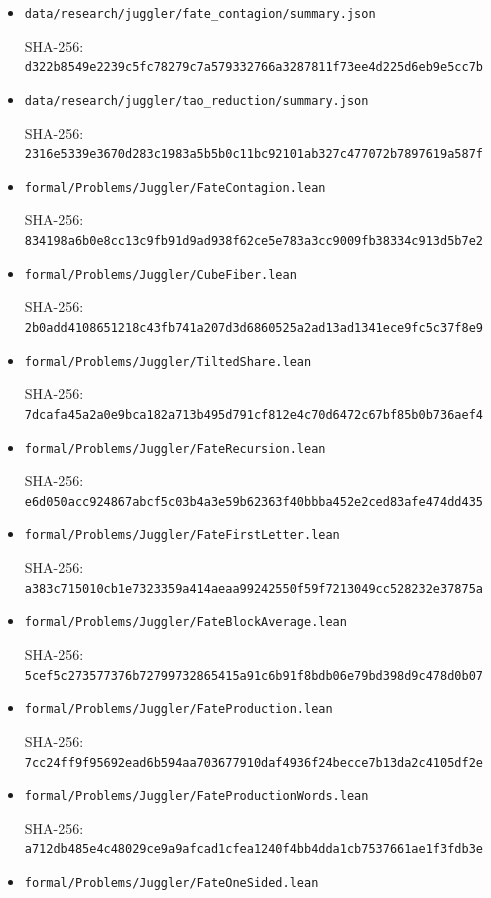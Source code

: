 \documentclass[11pt,a4paper]{article}
\begin{document}
\begin{itemize}
\item
  \texttt{\nolinkurl{data/research/juggler/fate_contagion/summary.json}}

  SHA-256:
  \texttt{\nolinkurl{d322b8549e2239c5fc78279c7a579332766a3287811f73ee4d225d6eb9e5cc7b}}
\item
  \texttt{\nolinkurl{data/research/juggler/tao_reduction/summary.json}}

  SHA-256:
  \texttt{\nolinkurl{2316e5339e3670d283c1983a5b5b0c11bc92101ab327c477072b7897619a587f}}
\item
  \texttt{\nolinkurl{formal/Problems/Juggler/FateContagion.lean}}

  SHA-256:
  \texttt{\nolinkurl{834198a6b0e8cc13c9fb91d9ad938f62ce5e783a3cc9009fb38334c913d5b7e2}}
\item
  \texttt{\nolinkurl{formal/Problems/Juggler/CubeFiber.lean}}

  SHA-256:
  \texttt{\nolinkurl{2b0add4108651218c43fb741a207d3d6860525a2ad13ad1341ece9fc5c37f8e9}}
\item
  \texttt{\nolinkurl{formal/Problems/Juggler/TiltedShare.lean}}

  SHA-256:
  \texttt{\nolinkurl{7dcafa45a2a0e9bca182a713b495d791cf812e4c70d6472c67bf85b0b736aef4}}
\item
  \texttt{\nolinkurl{formal/Problems/Juggler/FateRecursion.lean}}

  SHA-256:
  \texttt{\nolinkurl{e6d050acc924867abcf5c03b4a3e59b62363f40bbba452e2ced83afe474dd435}}
\item
  \texttt{\nolinkurl{formal/Problems/Juggler/FateFirstLetter.lean}}

  SHA-256:
  \texttt{\nolinkurl{a383c715010cb1e7323359a414aeaa99242550f59f7213049cc528232e37875a}}
\item
  \texttt{\nolinkurl{formal/Problems/Juggler/FateBlockAverage.lean}}

  SHA-256:
  \texttt{\nolinkurl{5cef5c273577376b72799732865415a91c6b91f8bdb06e79bd398d9c478d0b07}}
\item
  \texttt{\nolinkurl{formal/Problems/Juggler/FateProduction.lean}}

  SHA-256:
  \texttt{\nolinkurl{7cc24ff9f95692ead6b594aa703677910daf4936f24becce7b13da2c4105df2e}}
\item
  \texttt{\nolinkurl{formal/Problems/Juggler/FateProductionWords.lean}}

  SHA-256:
  \texttt{\nolinkurl{a712db485e4c48029ce9a9afcad1cfea1240f4bb4dda1cb7537661ae1f3fdb3e}}
\item
  \texttt{\nolinkurl{formal/Problems/Juggler/FateOneSided.lean}}


\end{itemize}
\end{document}
